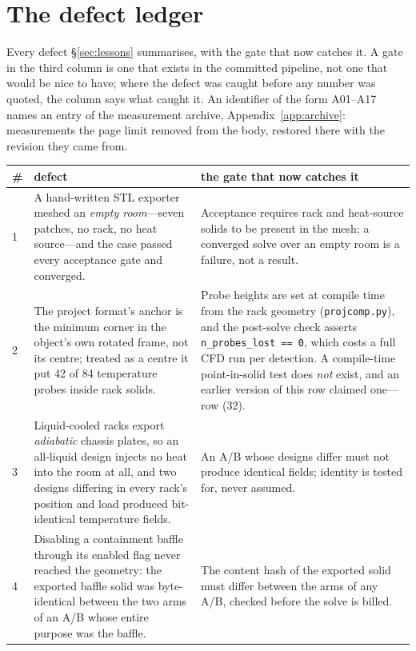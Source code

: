 \documentclass{article}
\begin{document}
\section{The defect ledger}
\label{app:defects}
Every defect \S\ref{sec:lessons} summarises, with the gate that now catches it.  A
gate in the third column is one that exists in the committed pipeline, not one that
would be nice to have; where the defect was caught before any number was quoted, the
column says what caught it.  An identifier of the form A01--A17 names an entry of the
measurement archive, Appendix~\ref{app:archive}: measurements the page limit removed
from the body, restored there with the revision they came from.

\begin{table}[p]
\centering
\small\sloppy
\setlength{\tabcolsep}{4pt}
\begin{tabular}{@{}p{0.6cm}p{7.3cm}p{7.3cm}@{}}
\toprule
\# & defect & the gate that now catches it \\
\midrule
1 & A hand-written STL exporter meshed an \emph{empty room}---seven patches, no rack, no heat source---and the case passed every acceptance gate and converged. & Acceptance requires rack and heat-source solids to be present in the mesh; a converged solve over an empty room is a failure, not a result. \\
2 & The project format's anchor is the minimum corner in the object's own rotated frame, not its centre; treated as a centre it put 42 of 84 temperature probes inside rack solids. & Probe heights are set at compile time from the rack geometry (\texttt{projcomp.py}), and the post-solve check asserts \texttt{n\_probes\_lost == 0}, which costs a full CFD run per detection.  A compile-time point-in-solid test does \emph{not} exist, and an earlier version of this row claimed one---row (32). \\
3 & Liquid-cooled racks export \emph{adiabatic} chassis plates, so an all-liquid design injects no heat into the room at all, and two designs differing in every rack's position and load produced bit-identical temperature fields. & An A/B whose designs differ must not produce identical fields; identity is tested for, never assumed. \\
4 & Disabling a containment baffle through its enabled flag never reached the geometry: the exported baffle solid was byte-identical between the two arms of an A/B whose entire purpose was the baffle. & The content hash of the exported solid must differ between the arms of any A/B, checked before the solve is billed. \\

\end{tabular}
\end{table}
\end{document}
